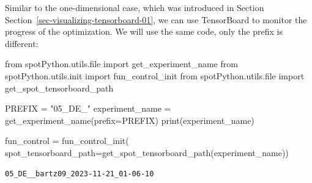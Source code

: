 \documentclass[
  letterpaper,
  DIV=11,
  numbers=noendperiod]{scrreprt}
\newenvironment{Shaded}{\begin{snugshade}}{\end{snugshade}}
\newcommand{\BuiltInTok}[1]{\textcolor[rgb]{0.00,0.23,0.31}{#1}}
\newcommand{\ImportTok}[1]{\textcolor[rgb]{0.00,0.46,0.62}{#1}}
\newcommand{\NormalTok}[1]{\textcolor[rgb]{0.00,0.23,0.31}{#1}}
\newcommand{\OperatorTok}[1]{\textcolor[rgb]{0.37,0.37,0.37}{#1}}
\newcommand{\StringTok}[1]{\textcolor[rgb]{0.13,0.47,0.30}{#1}}
\begin{document}
\begin{tcolorbox}[enhanced jigsaw, left=2mm, toprule=.15mm, colframe=quarto-callout-note-color-frame, leftrule=.75mm, title=\textcolor{quarto-callout-note-color}{\faInfo}\hspace{0.5em}{TensorBoard}, toptitle=1mm, opacitybacktitle=0.6, arc=.35mm, titlerule=0mm, opacityback=0, bottomtitle=1mm, coltitle=black, rightrule=.15mm, colback=white, colbacktitle=quarto-callout-note-color!10!white, breakable, bottomrule=.15mm]

Similar to the one-dimensional case, which was introduced in Section
Section~\ref{sec-visualizing-tensorboard-01}, we can use TensorBoard to
monitor the progress of the optimization. We will use the same code,
only the prefix is different:

\begin{Shaded}
\begin{Highlighting}[]
\ImportTok{from}\NormalTok{ spotPython.utils.}\BuiltInTok{file} \ImportTok{import}\NormalTok{ get\_experiment\_name}
\ImportTok{from}\NormalTok{ spotPython.utils.init }\ImportTok{import}\NormalTok{ fun\_control\_init}
\ImportTok{from}\NormalTok{ spotPython.utils.}\BuiltInTok{file} \ImportTok{import}\NormalTok{ get\_spot\_tensorboard\_path}

\NormalTok{PREFIX }\OperatorTok{=} \StringTok{"05\_DE\_"}
\NormalTok{experiment\_name }\OperatorTok{=}\NormalTok{ get\_experiment\_name(prefix}\OperatorTok{=}\NormalTok{PREFIX)}
\BuiltInTok{print}\NormalTok{(experiment\_name)}

\NormalTok{fun\_control }\OperatorTok{=}\NormalTok{ fun\_control\_init(}
\NormalTok{    spot\_tensorboard\_path}\OperatorTok{=}\NormalTok{get\_spot\_tensorboard\_path(experiment\_name))}
\end{Highlighting}
\end{Shaded}

\begin{verbatim}
05_DE__bartz09_2023-11-21_01-06-10
\end{verbatim}

\end{tcolorbox}
\end{document}
